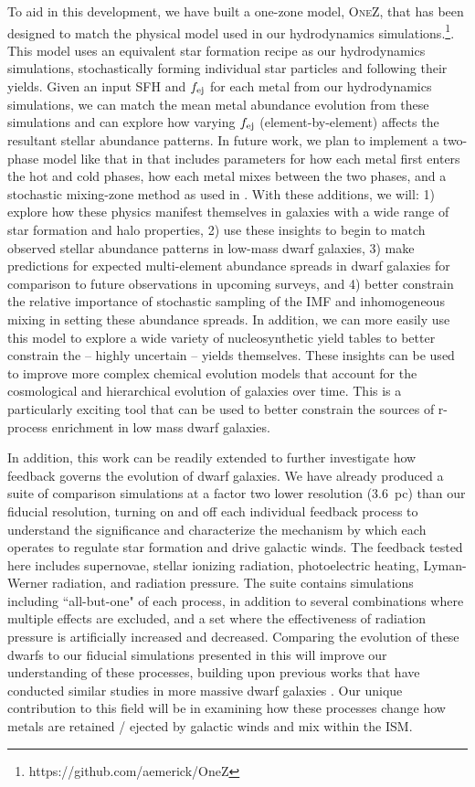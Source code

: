 To aid in this development, we have built a one-zone model, \textsc{OneZ}, that has been designed to match the physical model used in our hydrodynamics simulations.\footnote{https://github.com/aemerick/OneZ}. This model uses an equivalent star formation recipe as our hydrodynamics simulations, stochastically forming individual star particles and following their yields. Given an input SFH and $f_{\rm ej}$ for each metal from our hydrodynamics simulations, we can match the mean metal abundance evolution from these simulations and can explore how varying $f_{\rm ej}$ (element-by-element) affects the resultant stellar abundance patterns. In future work, we plan to implement a two-phase model like that in \cite{SchonrichWeinberg2019} that includes parameters for how each metal first enters the hot and cold phases, how each metal mixes between the two phases, and a stochastic mixing-zone method as used in \cite{Cescutti2008}. With these additions, we will: 1) explore how these physics manifest themselves in galaxies with a wide range of star formation and halo properties, 2) use these insights to begin to match observed stellar abundance patterns in low-mass dwarf galaxies, 3) make predictions for expected multi-element abundance spreads in dwarf galaxies for comparison to future observations in upcoming surveys, and 4) better constrain the relative importance of stochastic sampling of the IMF and inhomogeneous mixing in setting these abundance spreads. In addition, we can more easily use this model to explore a wide variety of nucleosynthetic yield tables to better constrain the -- highly uncertain -- yields themselves. These insights can be used to improve more complex chemical evolution models that account for the cosmological and hierarchical evolution of galaxies over time. This is a particularly exciting tool that can be used to better constrain the sources of r-process enrichment in low mass dwarf galaxies.

In addition, this work can be readily extended to further investigate how feedback governs the evolution of dwarf galaxies. We have already produced a suite of comparison simulations at a factor two lower resolution (3.6~pc) than our fiducial resolution, turning on and off each individual feedback process to understand the significance and characterize the mechanism by which each operates to regulate star formation and drive galactic winds. The feedback tested here includes supernovae, stellar ionizing radiation, photoelectric heating, Lyman-Werner radiation, and radiation pressure. The suite contains simulations including ``all-but-one" of each process, in addition to several combinations where multiple effects are excluded, and a set where the effectiveness of radiation pressure is artificially increased and decreased. Comparing the evolution of these dwarfs to our fiducial simulations presented in this \dissertation will improve our understanding of these processes, building upon previous works that have conducted similar studies in more massive dwarf galaxies \citep{Hu2016,Hu2017,Forbes2016,Hopkins2018}. Our unique contribution to this field will be in examining how these processes change how metals are retained / ejected by galactic winds and mix within the ISM.

